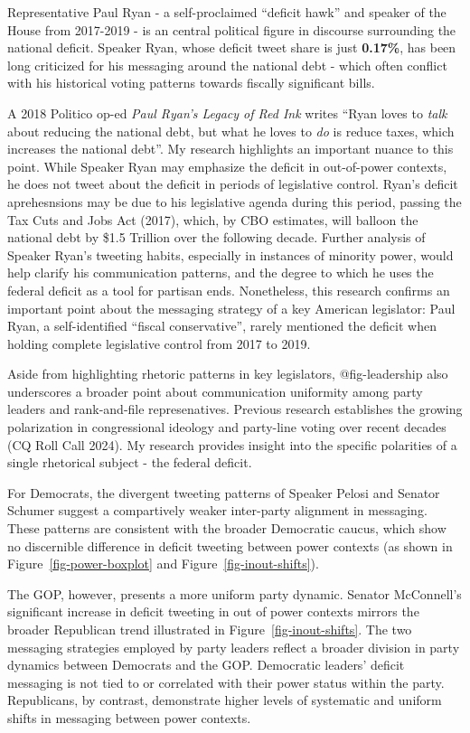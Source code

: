 \documentclass[
]{article}
\begin{document}
Representative Paul Ryan - a self-proclaimed ``deficit hawk'' and
speaker of the House from 2017-2019 - is an central political figure in
discourse surrounding the national deficit. Speaker Ryan, whose deficit
tweet share is just \textbf{0.17\%}, has been long criticized for his
messaging around the national debt - which often conflict with his
historical voting patterns towards fiscally significant bills.

A 2018 Politico op-ed \emph{Paul Ryan's Legacy of Red Ink} writes ``Ryan
loves to \emph{talk} about reducing the national debt, but what he loves
to \emph{do} is reduce taxes, which increases the national debt''. My
research highlights an important nuance to this point. While Speaker
Ryan may emphasize the deficit in out-of-power contexts, he does not
tweet about the deficit in periods of legislative control. Ryan's
deficit aprehesnsions may be due to his legislative agenda during this
period, passing the Tax Cuts and Jobs Act (2017), which, by CBO
estimates, will balloon the national debt by \$1.5 Trillion over the
following decade. Further analysis of Speaker Ryan's tweeting habits,
especially in instances of minority power, would help clarify his
communication patterns, and the degree to which he uses the federal
deficit as a tool for partisan ends. Nonetheless, this research confirms
an important point about the messaging strategy of a key American
legislator: Paul Ryan, a self-identified ``fiscal conservative'', rarely
mentioned the deficit when holding complete legislative control from
2017 to 2019.

Aside from highlighting rhetoric patterns in key legislators,
@fig-leadership also underscores a broader point about communication
uniformity among party leaders and rank-and-file represenatives.
Previous research establishes the growing polarization in congressional
ideology and party-line voting over recent decades (CQ Roll Call 2024).
My research provides insight into the specific polarities of a single
rhetorical subject - the federal deficit.

For Democrats, the divergent tweeting patterns of Speaker Pelosi and
Senator Schumer suggest a compartively weaker inter-party alignment in
messaging. These patterns are consistent with the broader Democratic
caucus, which show no discernible difference in deficit tweeting between
power contexts (as shown in Figure~\ref{fig-power-boxplot} and
Figure~\ref{fig-inout-shifts}).

The GOP, however, presents a more uniform party dynamic. Senator
McConnell's significant increase in deficit tweeting in out of power
contexts mirrors the broader Republican trend illustrated in
Figure~\ref{fig-inout-shifts}. The two messaging strategies employed by
party leaders reflect a broader division in party dynamics between
Democrats and the GOP. Democratic leaders' deficit messaging is not tied
to or correlated with their power status within the party. Republicans,
by contrast, demonstrate higher levels of systematic and uniform shifts
in messaging between power contexts.
\end{document}
